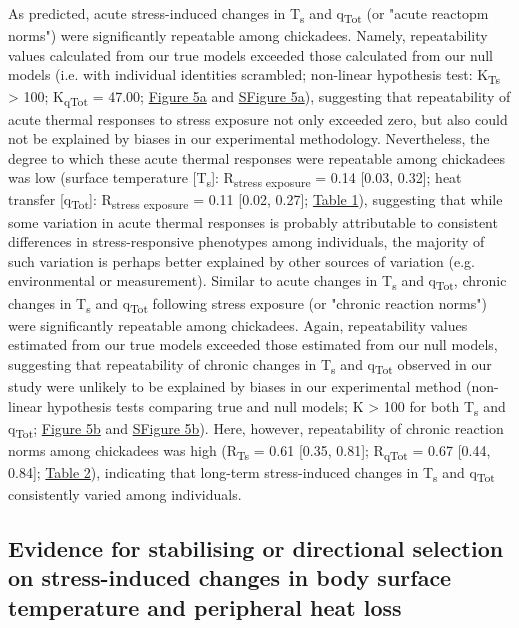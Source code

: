 \documentclass[12pt]{article}
\begin{document}
\noindent As predicted, acute stress-induced changes in T\textsubscript{s} and q\textsubscript{Tot} (or "acute reactopm norms") were significantly repeatable among chickadees. Namely, repeatability values calculated from our true models exceeded those calculated from our null models (i.e. with individual identities scrambled; non-linear hypothesis test: K\textsubscript{Ts} > 100; K\textsubscript{qTot} = 47.00; \hyperref[Fig4.5]{Figure 5a} and \hyperref[FigC.5]{SFigure 5a}), suggesting that repeatability of acute thermal responses to stress exposure not only exceeded zero, but also could not be explained by biases in our experimental methodology. Nevertheless, the degree to which these acute thermal responses were repeatable among chickadees was low (surface temperature [T\textsubscript{s}]: R\textsubscript{stress exposure} = 0.14 [0.03, 0.32]; heat transfer [q\textsubscript{Tot}]: R\textsubscript{stress exposure} = 0.11 [0.02, 0.27]; \hyperref[Tab4.1]{Table 1}), suggesting that while some variation in acute thermal responses is probably attributable to consistent differences in stress-responsive phenotypes among individuals, the majority of such variation is perhaps better explained by other sources of variation (e.g. environmental or measurement). Similar to acute changes in T\textsubscript{s} and q\textsubscript{Tot}, chronic changes in T\textsubscript{s} and q\textsubscript{Tot} following stress exposure (or "chronic reaction norms") were significantly repeatable among chickadees. Again, repeatability values estimated from our true models exceeded those estimated from our null models, suggesting that repeatability of chronic changes in T\textsubscript{s} and q\textsubscript{Tot} observed in our study were unlikely to be explained by biases in our experimental method (non-linear hypothesis tests comparing true and null models; K > 100 for both T\textsubscript{s} and q\textsubscript{Tot}; \hyperref[Fig4.5]{Figure 5b} and \hyperref[FigC.5]{SFigure 5b}). Here, however, repeatability of chronic reaction norms among chickadees was high (R\textsubscript{Ts} = 0.61 [0.35, 0.81]; R\textsubscript{qTot} = 0.67 [0.44, 0.84]; \hyperref[Tab4.2]{Table 2}), indicating that long-term stress-induced changes in T\textsubscript{s} and q\textsubscript{Tot} consistently varied among individuals. \vspace{0.5cm}

\subsection{Evidence for stabilising or directional selection on stress-induced changes in body surface temperature and peripheral heat loss}
\vspace{0.5cm}
\end{document}
